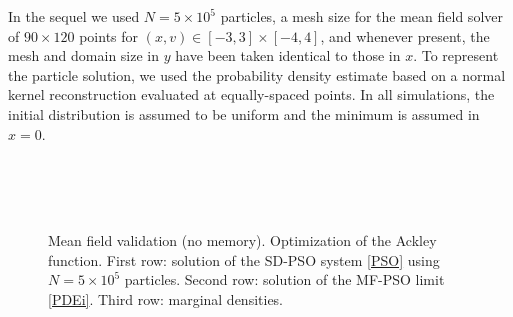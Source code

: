 \documentclass{ims9x6}
\begin{document}

In the sequel we used $N=5 \times 10^5$ particles, a mesh size for the mean field solver of $90 \times 120$ points for $(x,v)\in [-3,3]\times [-4,4]$, and whenever present, the mesh and domain size in $y$ have been taken identical to those in $x$. To represent the particle solution, we used the probability density estimate based on a normal kernel reconstruction evaluated at equally-spaced points. In all simulations, the initial distribution is assumed to be uniform and the minimum is assumed in $x=0$.

\begin{figure}[tb]
\begin{minipage}{\linewidth}
\centering
{} 
\\
  \\
\\
\caption{Mean field validation (no memory). Optimization of the Ackley function. First row: solution of the SD-PSO system \eqref{PSO} using $N=5 \times 10^5$ particles. Second row: solution of the MF-PSO limit \eqref{PDEi}. Third row: marginal densities.} 
\label{Fig2}
\end{minipage}
\end{figure}
\end{document}
